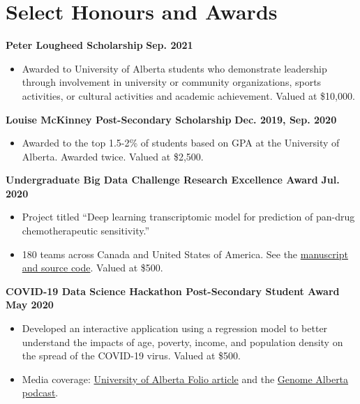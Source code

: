 \documentclass{article}
\begin{document}
\section*{\textcolor{my_colour}{Select Honours and Awards}}
\vspace{-.25em} \hrulefill \vspace{.75em}

\textbf{Peter Lougheed Scholarship} \hfill \textbf{Sep. 2021}
\begin{itemize}
    \item Awarded to University of Alberta students who demonstrate leadership through involvement in university or community organizations, sports activities, or cultural activities and academic achievement. Valued at \$10,000.
\end{itemize}

\textbf{Louise McKinney Post-Secondary Scholarship} \hfill \textbf{Dec. 2019, Sep. 2020}
\begin{itemize}
    \item Awarded to the top 1.5-2\% of students based on GPA at the University of Alberta. Awarded twice. Valued at \$2,500.
\end{itemize}

\textbf{Undergraduate Big Data Challenge Research Excellence Award} \hfill \textbf{Jul. 2020}
\begin{itemize}
    \item Project titled ``Deep learning transcriptomic model for prediction of pan-drug chemotherapeutic sensitivity.''
    \item 180 teams across Canada and United States of America. See the \href{https://github.com/tig3r66/youreka_genes}{manuscript and source code}. Valued at \$500.
\end{itemize}

\textbf{COVID-19 Data Science Hackathon Post-Secondary Student Award} \hfill \textbf{May 2020}
\begin{itemize}
    \item Developed an interactive application using a regression model to better understand the impacts of age, poverty, income, and population density on the spread of the COVID-19 virus. Valued at \$500.
    \item Media coverage: \href{https://www.folio.ca/students-develop-online-tool-to-predict-covid-19-spread-based-on-demographics/}{University of Alberta Folio article} and the \href{https://genomealberta.ca/genomics/genomics_blog_08182001.aspx}{Genome Alberta podcast}.
\end{itemize}
\end{document}
